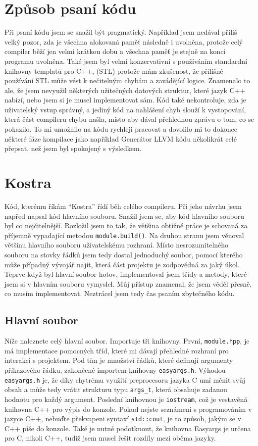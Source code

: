 \documentclass[12pt, a4paper, titlepage, abstract=on]{scrreprt}
\begin{document}
\section{Způsob psaní kódu}
Při psaní kódu jsem se snažil být pragmatický. Například jsem nedával příliš velký pozor, zda je všechna alokovaná paměť následně i uvolněna,
protože celý compiler běží jen velmi krátkou dobu a všechna paměť je stejně na konci programu uvolněna. Také jsem byl velmi konzervativní s
používáním standardní knihovny templatů pro C++, (STL) protože mám zkušenost, že přílišné používání STL může vést k nečitelným chybám a
zavádějící logice. Znamenalo to ale, že jsem nevyužil některých užitečných datových struktur, které jazyk C++ nabízí, nebo jsem si je musel
implementovat sám. Kód také nekontroluje, zda je uživatelský vstup správný, a jediný kód na nahlášení chyb slouží k vystopování, která
část compileru chybu našla, místo aby dával přehlednou zprávu o tom, co se pokazilo. To mi umožnilo na kódu rychleji pracovat a dovolilo mi
to dokonce některé fáze kompilace jako například Generátor LLVM kódu několikrát celé přepsat, než jsem byl spokojený s výsledkem.

\section{Kostra}
Kód, kterému říkám \enquote{Kostra} řídí běh celého compileru. Při jeho návrhu jsem napřed napsal kód hlavního souboru. Snažil jsem se,
aby kód hlavního souboru byl co nejčitelnější. Rozložil jsem to tak, že většina obtížné práce je schovaná za příjemně vypadající metodou
\texttt{module.build()}. Na druhou stranu jsem věnoval většinu hlavního souboru uživatelskému rozhraní. Místo nesrozumitelného souboru
na stovky řádků jsem tedy dostal jednoduchý soubor, pomocí kterého může případný vývojář najít, která část projektu je zodpovědná za jaký
úkol. Teprve když byl hlavní soubor hotov, implementoval jsem třídy a metody, které jsem si v hlavním souboru vymyslel. Můj přístup
znamenal, že jsem věděl přesně, co musím implementovat. Neztrácel jsem tedy čas psaním zbytečného kódu.
\subsection{Hlavní soubor}
Níže naleznete celý hlavní soubor. Importuje tři knihovny. První, \texttt{module.hpp}, je má implementace pomocných tříd, které mi dávají
přehledné rozhraní pro interakci s projektem. Pod tím je množství řádků, které definují argumenty příkazového řádku, zakončené importem
knihovny \texttt{easyargs.h}. Výhodou \texttt{easyargs.h} je, že díky chytrému využití preprocesoru jazyka C umí měnit svůj obsah a
může tedy vrátit strukturu typu \texttt{args\_t}, která obsahuje zadanou hodnotu pro každý argument. Poslední knihovnou je \texttt{iostream},
což je vestavěná knihovna C++ pro výpis do konzole. Pokud nejste seznámeni s programováním v jazyce C++, nebuďte překvapeni syntaxí
\texttt{std::cout}, je to způsob, jakým se v C++ píše do konzole. Také je nutné podotknout, že knihovna Easyargs je určena pro C, nikoli C++,
tudíž jsem musel řešit rozdíly mezi oběma jazyky.
\end{document}
